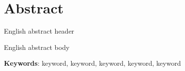 \section*{Abstract}

English abstract header

\medbreak

English abstract body

\medbreak
\noindent
\textbf{Keywords}: keyword, keyword, keyword, keyword, keyword